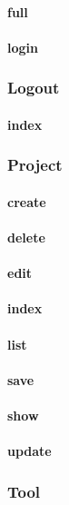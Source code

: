 \documentclass[12pt]{article}
\begin{document}
\paragraph{full}
\paragraph{login}

\subsubsection{Logout}\label{sec:CLogout}
\paragraph{index}

\subsubsection{Project}\label{sec:CProject}
\paragraph{create}
\paragraph{delete}
\paragraph{edit}
\paragraph{index}
\paragraph{list}
\paragraph{save}
\paragraph{show}
\paragraph{update}

\subsubsection{Tool}\label{sec:CTool}
\end{document}
